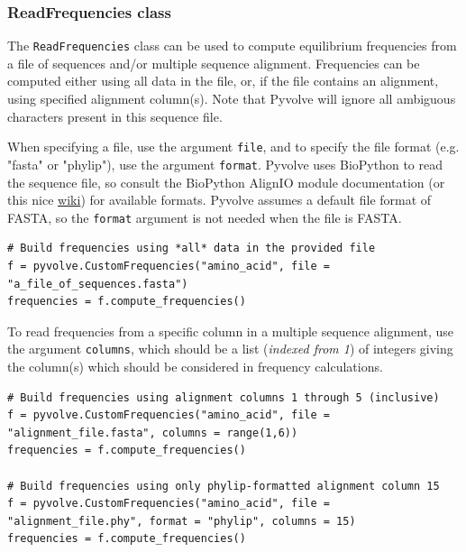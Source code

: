\documentclass{article}
\newcommand{\code}[1]{\texttt{\small{#1}}}
\begin{document}
\subsubsection{ReadFrequencies class}
The \code{ReadFrequencies} class can be used to compute equilibrium frequencies from a file of sequences and/or multiple sequence alignment. Frequencies can be computed either using all data in the file, or, if the file contains an alignment, using specified alignment column(s).
Note that Pyvolve will ignore all ambiguous characters present in this sequence file.

When specifying a file, use the argument \code{file}, and to specify the file format (e.g. "fasta" or "phylip"), use the argument \code{format}. Pyvolve uses BioPython to read the sequence file, so consult the BioPython AlignIO module documentation (or this nice \href{http://biopython.org/wiki/AlignIO}{wiki}) for available formats. Pyvolve assumes a default file format of FASTA, so the \code{format} argument is not needed when the file is FASTA.

\begin{lstlisting}
# Build frequencies using *all* data in the provided file
f = pyvolve.CustomFrequencies("amino_acid", file = "a_file_of_sequences.fasta")
frequencies = f.compute_frequencies()
\end{lstlisting}

To read frequencies from a specific column in a multiple sequence alignment, use the argument \code{columns}, which should be a list (\emph{indexed from 1}) of integers giving the column(s) which should be considered in frequency calculations.
\begin{lstlisting}
# Build frequencies using alignment columns 1 through 5 (inclusive)
f = pyvolve.CustomFrequencies("amino_acid", file = "alignment_file.fasta", columns = range(1,6))
frequencies = f.compute_frequencies()

# Build frequencies using only phylip-formatted alignment column 15
f = pyvolve.CustomFrequencies("amino_acid", file = "alignment_file.phy", format = "phylip", columns = 15)
frequencies = f.compute_frequencies()

\end{lstlisting}
\end{document}
